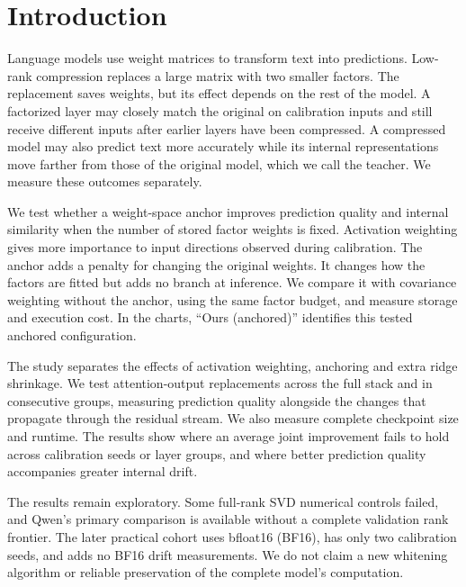 \documentclass[conference]{IEEEtran}
\begin{document}
\section{Introduction}
Language models use weight matrices to transform text into predictions. Low-rank compression replaces a large matrix with two smaller factors. The replacement saves weights, but its effect depends on the rest of the model. A factorized layer may closely match the original on calibration inputs and still receive different inputs after earlier layers have been compressed. A compressed model may also predict text more accurately while its internal representations move farther from those of the original model, which we call the teacher. We measure these outcomes separately.\par\smallskip
We test whether a weight-space anchor improves prediction quality and internal similarity when the number of stored factor weights is fixed. Activation weighting gives more importance to input directions observed during calibration. The anchor adds a penalty for changing the original weights. It changes how the factors are fitted but adds no branch at inference. We compare it with covariance weighting without the anchor, using the same factor budget, and measure storage and execution cost. In the charts, ``Ours (anchored)'' identifies this tested anchored configuration.\par\smallskip
The study separates the effects of activation weighting, anchoring and extra ridge shrinkage. We test attention-output replacements across the full stack and in consecutive groups, measuring prediction quality alongside the changes that propagate through the residual stream. We also measure complete checkpoint size and runtime. The results show where an average joint improvement fails to hold across calibration seeds or layer groups, and where better prediction quality accompanies greater internal drift.\par\smallskip
The results remain exploratory. Some full-rank SVD numerical controls failed, and Qwen's primary comparison is available without a complete validation rank frontier. The later practical cohort uses bfloat16 (BF16), has only two calibration seeds, and adds no BF16 drift measurements. We do not claim a new whitening algorithm or reliable preservation of the complete model's computation.\par\smallskip
\end{document}
